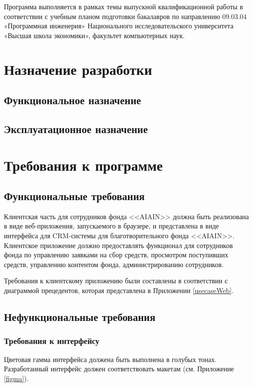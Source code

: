 \documentclass[a4paper,12pt,reqno]{article}
\begin{document}
 Программа выполняется в рамках темы выпускной квалификационной работы в соответствии с учебным планом подготовки бакалавров по направлению 09.03.04 «Программная инженерия» Национального исследовательского университета «Высшая школа экономики», факультет компьютерных наук.
	
	\newpage 
	\section{Назначение разработки}
	 
	\subsection{Функциональное назначение}
	
	\subsection{Эксплуатационное назначение}
	 
	
						\newpage
	\section{Требования к программе}
	
	\subsection{Функциональные требования}
	
	Клиентская часть для сотрудников фонда <<AIAIN>> должна быть реализована в виде веб-приложения, запускаемого в браузере, и представлена в виде интерфейса для CRM-системы для благотворительного фонда <<AIAIN>>. Клиентское приложение должно предоставлять функционал для сотрудников фонда по управлению заявками на сбор средств, просмотром поступивших средств, управлению контентом фонда, администрированию сотрудников. 
	
	Требования к клиентскому приложению были составлены в соответствии с диаграммой прецедентов, которая представлена в Приложении \ref{usecaseWeb}.

    
    
    \subsection{Нефункциональные требования}
    
    \subsubsection{Требования к интерфейсу}
	Цветовая гамма интерфейса должена быть выполнена в голубых тонах. Разработанный интерфейс должен соответствовать макетам (см. Приложение \ref{figma}).
	
\end{document}
